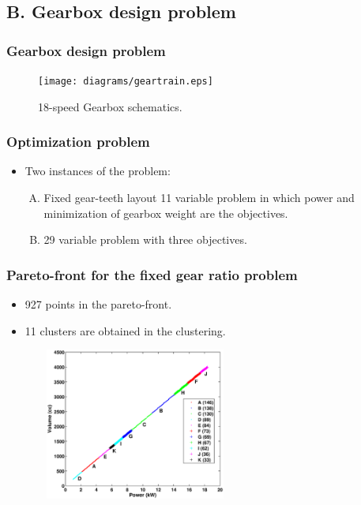 \documentclass[svgnames, table, smaller]{beamer}
\begin{document}
\subsection{B. Gearbox design problem}

\begin{frame}
  \frametitle{Gearbox design problem}
  \begin{figure}[ht]\begin{center}
      \texttt{[image: diagrams/geartrain.eps]}
      \caption{18-speed Gearbox schematics.}
      \label{geartrain}
    \end{center}
  \end{figure}

\end{frame}


\begin{frame}[allowframebreaks]
  \frametitle{Optimization problem}
  \begin{itemize}
  \item Two instances of the problem:
    \begin{enumerate}[(A)]
    \item Fixed gear-teeth layout 11 variable problem in which power and
      minimization of gearbox weight are the objectives.
    \item 29 variable problem with three objectives.
    \end{enumerate}

  \end{itemize}

  
\end{frame}



\begin{frame}
  \frametitle{Pareto-front for the fixed gear ratio problem}

  \begin{itemize}
  \item 927 points in the pareto-front.
  \item 11 clusters are obtained in the clustering.
  \end{itemize}

  \begin{figure}[ht]\begin{center}
      \includegraphics[width=65mm, height=50mm]{dia/gt11cpareto1.eps}
      \label{gt11Clusters}
    \end{center}
  \end{figure}
\end{frame}
\end{document}
